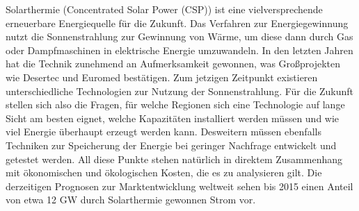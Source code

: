 Solarthermie (Concentrated Solar Power (CSP)) ist eine vielversprechende erneuerbare Energiequelle für die Zukunft. Das Verfahren zur Energiegewinnung nutzt die Sonnenstrahlung zur Gewinnung von Wärme, um diese dann durch Gas oder Dampfmaschinen in elektrische Energie umzuwandeln. In den letzten Jahren hat die Technik zunehmend an Aufmerksamkeit gewonnen, was Großprojekten wie Desertec und Euromed bestätigen. Zum jetzigen Zeitpunkt existieren unterschiedliche Technologien zur Nutzung der Sonnenstrahlung. Für die Zukunft stellen sich also die Fragen, für welche Regionen sich eine Technologie auf lange Sicht am besten eignet, welche Kapazitäten installiert werden müssen und wie viel Energie überhaupt erzeugt werden kann. Desweitern müssen ebenfalls Techniken zur Speicherung der Energie bei geringer Nachfrage entwickelt und getestet werden. All diese Punkte stehen natürlich in direktem Zusammenhang mit ökonomischen und ökologischen Kosten, die es zu analysieren gilt. Die derzeitigen Prognosen zur Marktentwicklung weltweit sehen bis 2015 einen Anteil von etwa 12 GW durch Solarthermie gewonnen Strom vor.
